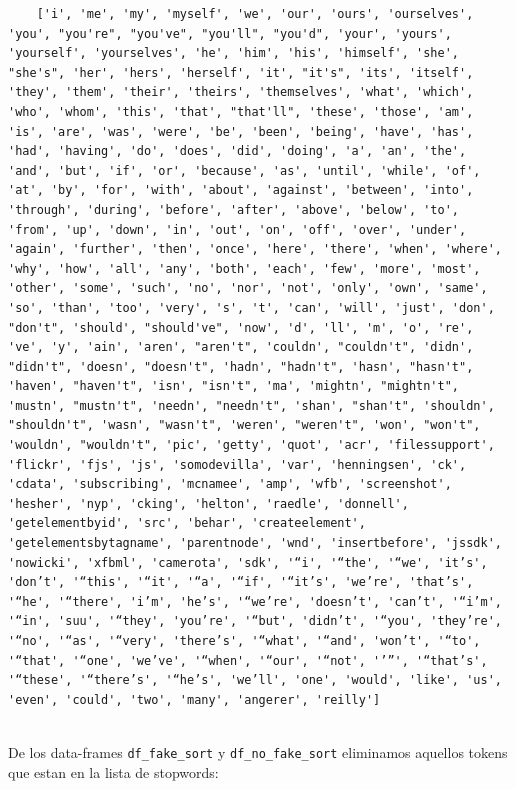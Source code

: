 \documentclass[
  11pt,
  a4paper,
]{article}
\begin{document}
\begin{verbatim}
    ['i', 'me', 'my', 'myself', 'we', 'our', 'ours', 'ourselves', 'you', "you're", "you've", "you'll", "you'd", 'your', 'yours', 'yourself', 'yourselves', 'he', 'him', 'his', 'himself', 'she', "she's", 'her', 'hers', 'herself', 'it', "it's", 'its', 'itself', 'they', 'them', 'their', 'theirs', 'themselves', 'what', 'which', 'who', 'whom', 'this', 'that', "that'll", 'these', 'those', 'am', 'is', 'are', 'was', 'were', 'be', 'been', 'being', 'have', 'has', 'had', 'having', 'do', 'does', 'did', 'doing', 'a', 'an', 'the', 'and', 'but', 'if', 'or', 'because', 'as', 'until', 'while', 'of', 'at', 'by', 'for', 'with', 'about', 'against', 'between', 'into', 'through', 'during', 'before', 'after', 'above', 'below', 'to', 'from', 'up', 'down', 'in', 'out', 'on', 'off', 'over', 'under', 'again', 'further', 'then', 'once', 'here', 'there', 'when', 'where', 'why', 'how', 'all', 'any', 'both', 'each', 'few', 'more', 'most', 'other', 'some', 'such', 'no', 'nor', 'not', 'only', 'own', 'same', 'so', 'than', 'too', 'very', 's', 't', 'can', 'will', 'just', 'don', "don't", 'should', "should've", 'now', 'd', 'll', 'm', 'o', 're', 've', 'y', 'ain', 'aren', "aren't", 'couldn', "couldn't", 'didn', "didn't", 'doesn', "doesn't", 'hadn', "hadn't", 'hasn', "hasn't", 'haven', "haven't", 'isn', "isn't", 'ma', 'mightn', "mightn't", 'mustn', "mustn't", 'needn', "needn't", 'shan', "shan't", 'shouldn', "shouldn't", 'wasn', "wasn't", 'weren', "weren't", 'won', "won't", 'wouldn', "wouldn't", 'pic', 'getty', 'quot', 'acr', 'filessupport', 'flickr', 'fjs', 'js', 'somodevilla', 'var', 'henningsen', 'ck', 'cdata', 'subscribing', 'mcnamee', 'amp', 'wfb', 'screenshot', 'hesher', 'nyp', 'cking', 'helton', 'raedle', 'donnell', 'getelementbyid', 'src', 'behar', 'createelement', 'getelementsbytagname', 'parentnode', 'wnd', 'insertbefore', 'jssdk', 'nowicki', 'xfbml', 'camerota', 'sdk', '“i', '“the', '“we', 'it’s', 'don’t', '“this', '“it', '“a', '“if', '“it’s', 'we’re', 'that’s', '“he', '“there', 'i’m', 'he’s', '“we’re', 'doesn’t', 'can’t', '“i’m', '“in', 'suu', '“they', 'you’re', '“but', 'didn’t', '“you', 'they’re', '“no', '“as', '“very', 'there’s', '“what', '“and', 'won’t', '“to', '“that', '“one', 'we’ve', '“when', '“our', '“not', '’”', '“that’s', '“these', '“there’s', '“he’s', 'we’ll', 'one', 'would', 'like', 'us', 'even', 'could', 'two', 'many', 'angerer', 'reilly']
    
\end{verbatim}

De los data-frames \texttt{df\_fake\_sort} y \texttt{df\_no\_fake\_sort}
eliminamos aquellos tokens que estan en la lista de stopwords:
\end{document}
